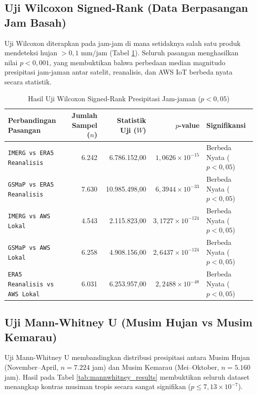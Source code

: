 \documentclass[11pt,a4paper]{article}
\begin{document}
\subsection{Uji Wilcoxon Signed-Rank (Data Berpasangan Jam Basah)}
Uji Wilcoxon diterapkan pada jam-jam di mana setidaknya salah satu produk mendeteksi hujan $> 0{,}1\text{ mm/jam}$ (Tabel \ref{tab:wilcoxon_results}). Seluruh pasangan menghasilkan nilai $p < 0{,}001$, yang membuktikan bahwa perbedaan median magnitudo presipitasi jam-jaman antar satelit, reanalisis, dan AWS IoT berbeda nyata secara statistik.

\begin{table}[htbp]
\centering
\small
\caption{Hasil Uji Wilcoxon Signed-Rank Presipitasi Jam-jaman ($p < 0{,}05$)}
\label{tab:wilcoxon_results}
\begin{tabular*}{\textwidth}{@{\extracolsep{\fill}}lrrrl@{}}
\toprule
\textbf{Perbandingan Pasangan} & \textbf{Jumlah Sampel ($n$)} & \textbf{Statistik Uji ($W$)} & \textbf{$p$-value} & \textbf{Signifikansi} \\
\midrule
\texttt{IMERG vs ERA5 Reanalisis} & 6.242 & 6.786.152{,}00 & $1{,}0626 \times 10^{-15}$ & Berbeda Nyata ($p < 0{,}05$) \\
\texttt{GSMaP vs ERA5 Reanalisis} & 7.630 & 10.985.498{,}00 & $6{,}3944 \times 10^{-33}$ & Berbeda Nyata ($p < 0{,}05$) \\
\texttt{IMERG vs AWS Lokal} & 4.543 & 2.115.823{,}00 & $3{,}1727 \times 10^{-124}$ & Berbeda Nyata ($p < 0{,}05$) \\
\texttt{GSMaP vs AWS Lokal} & 6.258 & 4.908.156{,}00 & $2{,}6437 \times 10^{-124}$ & Berbeda Nyata ($p < 0{,}05$) \\
\texttt{ERA5 Reanalisis vs AWS Lokal} & 6.031 & 6.253.957{,}00 & $2{,}2488 \times 10^{-48}$ & Berbeda Nyata ($p < 0{,}05$) \\
\bottomrule
\end{tabular*}
\end{table}

\subsection{Uji Mann-Whitney U (Musim Hujan vs Musim Kemarau)}
Uji Mann-Whitney U membandingkan distribusi presipitasi antara Musim Hujan (November--April, $n = 7.224$ jam) dan Musim Kemarau (Mei--Oktober, $n = 5.160$ jam). Hasil pada Tabel \ref{tab:mannwhitney_results} membuktikan seluruh dataset menangkap kontras musiman tropis secara sangat signifikan ($p \le 7{,}13 \times 10^{-7}$).
\end{document}
